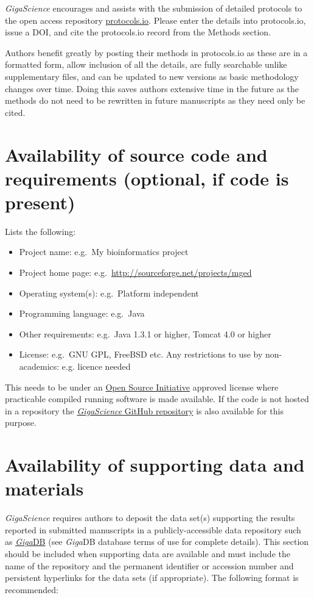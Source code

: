 \documentclass[a4paper,num-refs]{oup-contemporary}
\begin{document}
\emph{GigaScience} encourages and assists with the submission of detailed protocols to the open access repository \href{https://www.protocols.io/}{protocols.io}. Please enter the details into protocols.io, issue a DOI, and cite the protocols.io record from the Methods section.

Authors benefit greatly by posting their methods in protocols.io as these are in a formatted form, allow inclusion of all the details, are fully searchable unlike supplementary files, and can be updated to new versions as basic methodology changes over time. Doing this saves authors extensive time in the future as the methods do not need to be rewritten in future manuscripts as they need only be cited.

\section{Availability of source code and requirements (optional, if code is present)}

Lists the following:
\begin{itemize}
\item Project name: e.g.~My bioinformatics project
\item Project home page: e.g.~\url{http://sourceforge.net/projects/mged}
\item Operating system(s): e.g.~Platform independent
\item Programming language: e.g.~Java
\item Other requirements: e.g.~Java 1.3.1 or higher, Tomcat 4.0 or higher
\item License: e.g.~GNU GPL, FreeBSD etc.
Any restrictions to use by non-academics: e.g. licence needed
\end{itemize}

This needs to be under an \href{http:/opensource.org/licenses}{Open Source Initiative} approved license where practicable compiled running software is made available. If the code is not hosted in a repository the \href{https://github.com/gigascience}{\textit{GigaScience} GitHub repository} is also available for this purpose.

\section{Availability of supporting data and materials}

\textit{GigaScience} requires authors to deposit the data set(s) supporting the results reported in submitted manuscripts in a publicly-accessible data repository such as \href{http://gigadb.org/}{\textit{Giga}DB} (see \textit{Giga}DB database terms of use for complete details). This section should be included when supporting data are available and must include the name of the repository and the permanent identifier or accession number and persistent hyperlinks for the data sets (if appropriate). The following format is recommended:
\end{document}
